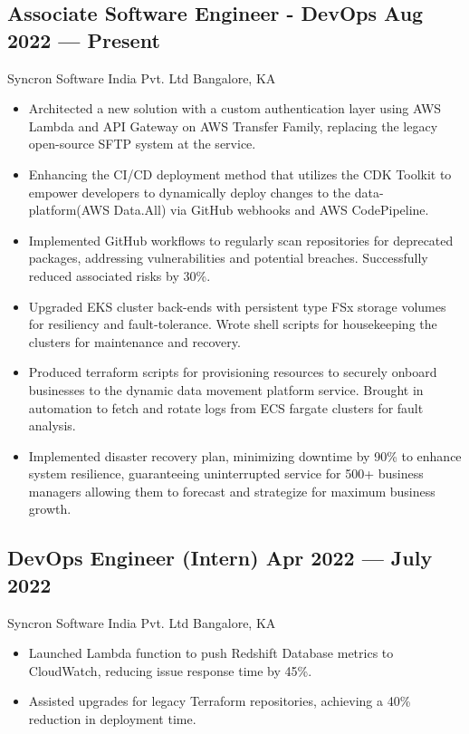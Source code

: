 \documentclass[a4,10pt]{article}
\newcommand{\subtext}[1]{
#1\par\vspace{-0.2cm}}
\newenvironment{zitemize}{
\begin{itemize}\itemsep0pt \parskip0pt \parsep1pt}
{\end{itemize}\vspace{-0.5cm}}
\begin{document}
\subsection*{Associate Software Engineer - DevOps \hfill Aug 2022 --- Present} 
\subtext{Syncron Software India Pvt. Ltd \hfill Bangalore, KA} 
    \begin{zitemize}
        \item Architected a new solution with a custom authentication layer using AWS Lambda and API Gateway on AWS Transfer Family, replacing the legacy open-source SFTP system at the service.
        \item Enhancing the CI/CD deployment method that utilizes the CDK Toolkit to empower developers to dynamically deploy changes to the data-platform(AWS Data.All) via GitHub webhooks and AWS CodePipeline.
        \item Implemented GitHub workflows to regularly scan repositories for deprecated packages, addressing vulnerabilities and potential breaches. Successfully reduced associated risks by 30\%.
        \item Upgraded EKS cluster back-ends with persistent type FSx storage volumes for resiliency and fault-tolerance. Wrote shell scripts for housekeeping the clusters for maintenance and recovery.
        \item Produced terraform scripts for provisioning resources to securely onboard businesses to the dynamic data movement platform service. Brought in automation to fetch and rotate logs from ECS fargate clusters for fault analysis. 
        \item Implemented disaster recovery plan, minimizing downtime by 90\% to enhance system resilience, guaranteeing uninterrupted service for 500+ business managers allowing them to forecast and strategize for maximum business growth. 
    \end{zitemize}


\subsection*{DevOps Engineer {\normalsize\normalfont (Intern)} \hfill Apr 2022 --- July 2022} 
\subtext{Syncron Software India Pvt. Ltd \hfill Bangalore, KA} 
    \begin{zitemize}
        \item Launched Lambda function to push Redshift Database metrics to CloudWatch, reducing issue response time by 45\%.
        \item Assisted upgrades for legacy Terraform repositories, achieving a 40\% reduction in deployment time.
    \end{zitemize}
\end{document}

